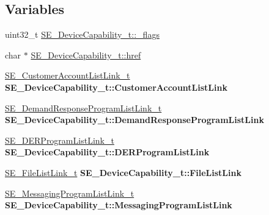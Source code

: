 \subsection*{Variables}
\begin{DoxyCompactItemize}
\item 
uint32\+\_\+t \hyperlink{group__DeviceCapability_ga98256bcf33639c1d6e735d1079fd2069}{S\+E\+\_\+\+Device\+Capability\+\_\+t\+::\+\_\+flags}
\item 
char $\ast$ \hyperlink{group__DeviceCapability_ga67440b38a37d6f2b067aa93494458133}{S\+E\+\_\+\+Device\+Capability\+\_\+t\+::href}
\item 
\mbox{\label{group__DeviceCapability_gabff99f5e0b6e8b93af6a8a7564060dab}} 
\hyperlink{structSE__CustomerAccountListLink__t}{S\+E\+\_\+\+Customer\+Account\+List\+Link\+\_\+t} {\bfseries S\+E\+\_\+\+Device\+Capability\+\_\+t\+::\+Customer\+Account\+List\+Link}
\item 
\mbox{\label{group__DeviceCapability_ga458499bddd65ceb071770e2278b41f5c}} 
\hyperlink{structSE__DemandResponseProgramListLink__t}{S\+E\+\_\+\+Demand\+Response\+Program\+List\+Link\+\_\+t} {\bfseries S\+E\+\_\+\+Device\+Capability\+\_\+t\+::\+Demand\+Response\+Program\+List\+Link}
\item 
\mbox{\label{group__DeviceCapability_ga04aab431d91702ec95e546ef0281af9d}} 
\hyperlink{structSE__DERProgramListLink__t}{S\+E\+\_\+\+D\+E\+R\+Program\+List\+Link\+\_\+t} {\bfseries S\+E\+\_\+\+Device\+Capability\+\_\+t\+::\+D\+E\+R\+Program\+List\+Link}
\item 
\mbox{\label{group__DeviceCapability_ga369bd2b4459b2bc17d65473433fcce5b}} 
\hyperlink{structSE__FileListLink__t}{S\+E\+\_\+\+File\+List\+Link\+\_\+t} {\bfseries S\+E\+\_\+\+Device\+Capability\+\_\+t\+::\+File\+List\+Link}
\item 
\mbox{\label{group__DeviceCapability_gac9d002327db447d4d127a4a04033cca7}} 
\hyperlink{structSE__MessagingProgramListLink__t}{S\+E\+\_\+\+Messaging\+Program\+List\+Link\+\_\+t} {\bfseries S\+E\+\_\+\+Device\+Capability\+\_\+t\+::\+Messaging\+Program\+List\+Link}
\item 
\mbox{\label{group__DeviceCapability_gadaea19b2b77f8ae92206505bada4fea4}} 

\end{DoxyCompactItemize}
